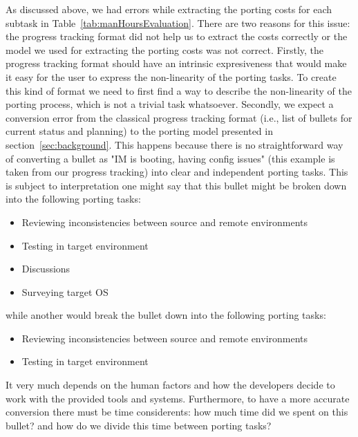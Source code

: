 As discussed above, we had errors while extracting the porting costs for each
subtask in Table~\ref{tab:manHoursEvaluation}. There are two reasons for this
issue: the progress tracking format did not help us to extract the costs
correctly or the model we used for extracting the porting costs was not correct.
Firstly, the progress tracking format should have an intrinsic expresiveness that would
make it easy for the user to express the non-linearity of the porting tasks. To
create this kind of format we need to first find a way to describe the
non-linearity of the porting process, which is not a trivial task whatsoever.
Secondly, we expect a conversion error from the classical progress tracking
format (i.e., list of bullets for current status and planning) to the porting
model presented in section~\ref{sec:background}. This happens because there is
no straightforward way of converting a bullet as "IM is booting, having config
issues" (this example is taken from our progress tracking) into clear and
independent porting tasks. This is subject to interpretation one might say that
this bullet might be broken down into the following porting tasks:
\begin{itemize}
        \item Reviewing inconsistencies between source and remote environments
        \item Testing in target environment
        \item Discussions
        \item Surveying target OS
\end{itemize}
while another would break the bullet down into the following porting tasks:
\begin{itemize}
        \item Reviewing inconsistencies between source and remote environments
        \item Testing in target environment
\end{itemize}
It very much depends on the human factors and how the developers decide to work
with the provided tools and systems. Furthermore, to have a more accurate
conversion there must be time considerents: how much time did we spent on this
bullet? and how do we divide this time between porting tasks?

